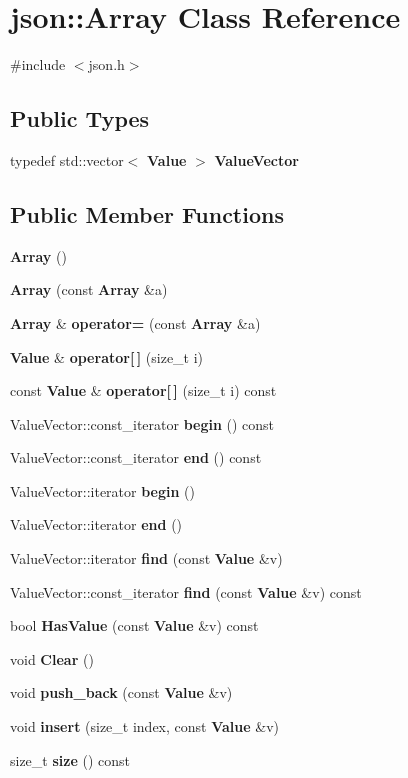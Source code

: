 \section{json\+:\+:Array Class Reference}
\label{classjson_1_1_array}


{\ttfamily \#include $<$json.\+h$>$}

\subsection*{Public Types}
\begin{DoxyCompactItemize}
\item 
typedef std\+::vector$<$ {\bf Value} $>$ {\bf Value\+Vector}
\end{DoxyCompactItemize}
\subsection*{Public Member Functions}
\begin{DoxyCompactItemize}
\item 
{\bf Array} ()
\item 
{\bf Array} (const {\bf Array} \&a)
\item 
{\bf Array} \& {\bf operator=} (const {\bf Array} \&a)
\item 
{\bf Value} \& {\bf operator[$\,$]} (size\+\_\+t i)
\item 
const {\bf Value} \& {\bf operator[$\,$]} (size\+\_\+t i) const 
\item 
Value\+Vector\+::const\+\_\+iterator {\bf begin} () const 
\item 
Value\+Vector\+::const\+\_\+iterator {\bf end} () const 
\item 
Value\+Vector\+::iterator {\bf begin} ()
\item 
Value\+Vector\+::iterator {\bf end} ()
\item 
Value\+Vector\+::iterator {\bf find} (const {\bf Value} \&v)
\item 
Value\+Vector\+::const\+\_\+iterator {\bf find} (const {\bf Value} \&v) const 
\item 
bool {\bf Has\+Value} (const {\bf Value} \&v) const 
\item 
void {\bf Clear} ()
\item 
void {\bf push\+\_\+back} (const {\bf Value} \&v)
\item 
void {\bf insert} (size\+\_\+t index, const {\bf Value} \&v)
\item 
size\+\_\+t {\bf size} () const 
\end{DoxyCompactItemize}

